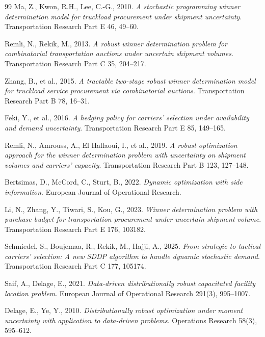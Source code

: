 \documentclass[11pt,a4paper]{ctexart}
\begin{document}
\begin{thebibliography}{99}
Ma, Z., Kwon, R.H., Lee, C.-G., 2010. \emph{A stochastic programming winner determination model for truckload procurement under shipment uncertainty}. Transportation Research Part E 46, 49--60.

Remli, N., Rekik, M., 2013. \emph{A robust winner determination problem for combinatorial transportation auctions under uncertain shipment volumes}. Transportation Research Part C 35, 204--217.

Zhang, B., et al., 2015. \emph{A tractable two-stage robust winner determination model for truckload service procurement via combinatorial auctions}. Transportation Research Part B 78, 16--31.

Feki, Y., et al., 2016. \emph{A hedging policy for carriers' selection under availability and demand uncertainty}. Transportation Research Part E 85, 149--165.

Remli, N., Amrouss, A., El Hallaoui, I., et al., 2019. \emph{A robust optimization approach for the winner determination problem with uncertainty on shipment volumes and carriers' capacity}. Transportation Research Part B 123, 127--148.

Bertsimas, D., McCord, C., Sturt, B., 2022. \emph{Dynamic optimization with side information}. European Journal of Operational Research.

Li, N., Zhang, Y., Tiwari, S., Kou, G., 2023. \emph{Winner determination problem with purchase budget for transportation procurement under uncertain shipment volume}. Transportation Research Part E 176, 103182.

Schmiedel, S., Boujemaa, R., Rekik, M., Hajji, A., 2025. \emph{From strategic to tactical carriers' selection: A new SDDP algorithm to handle dynamic stochastic demand}. Transportation Research Part C 177, 105174.

Saif, A., Delage, E., 2021. \emph{Data-driven distributionally robust capacitated facility location problem}. European Journal of Operational Research 291(3), 995--1007.

Delage, E., Ye, Y., 2010. \emph{Distributionally robust optimization under moment uncertainty with application to data-driven problems}. Operations Research 58(3), 595--612.

\end{thebibliography}
\end{document}
